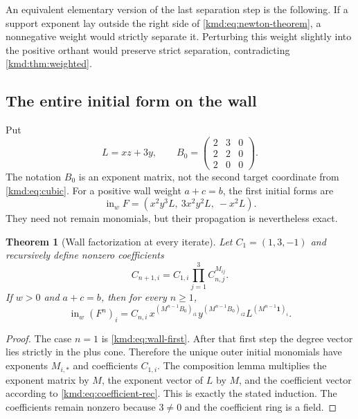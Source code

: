 \documentclass[11pt,a4paper]{article}
\numberwithin{equation}{section}
\newtheorem{theorem}{Theorem}[section]
\theoremstyle{definition}
\theoremstyle{remark}
\newcommand{\one}{\mathbf 1}
\newcommand{\init}{\operatorname{in}}
\begin{document}
An equivalent elementary version of the last separation step is the
following. If a support exponent lay outside the right side of
\eqref{kmd:eq:newton-theorem}, a nonnegative weight would strictly
separate it. Perturbing this weight slightly into the positive
orthant would preserve strict separation, contradicting
\cref{kmd:thm:weighted}.

\subsection{The entire initial form on the wall}
Put
\begin{equation}
 L=xz+3y,\qquad
 B_0=\begin{pmatrix}2&3&0\\2&2&0\\2&0&0\end{pmatrix}.
 \label{kmd:eq:B0}
\end{equation}
The notation $B_0$ is an exponent matrix, not the second target
coordinate from \eqref{kmd:eq:cubic}. For a positive wall weight
$a+c=b$, the first initial forms are
\begin{equation}
 \init_w F=(x^2y^3L,\ 3x^2y^2L,\ -x^2L).
 \label{kmd:eq:wall-first}
\end{equation}
They need not remain monomials, but their propagation is nevertheless
exact.

\begin{theorem}[Wall factorization at every iterate]\label{kmd:thm:wall}
Let $C_1=(1,3,-1)$ and recursively define nonzero coefficients
\begin{equation}
 C_{n+1,i}=C_{1,i}\prod_{j=1}^3C_{n,j}^{M_{ij}}.
 \label{kmd:eq:coefficient-rec}
\end{equation}
If $w>0$ and $a+c=b$, then for every $n\ge1$,
\begin{equation}
 \init_w(F^n)_i
 =C_{n,i}\,
 x^{(M^{n-1}B_0)_{i1}}
 y^{(M^{n-1}B_0)_{i2}}
 L^{(M^{n-1}\one)_i}.
 \label{kmd:eq:wall-all}
\end{equation}
\end{theorem}
\begin{proof}
The case $n=1$ is \eqref{kmd:eq:wall-first}. After that first step the
degree vector lies strictly in the plus cone. Therefore the unique
outer initial monomials have exponents $M_{i,*}$ and coefficients
$C_{1,i}$. The composition lemma multiplies the exponent matrix by
$M$, the exponent vector of $L$ by $M$, and the coefficient vector
according to \eqref{kmd:eq:coefficient-rec}. This is exactly the stated
induction. The coefficients remain nonzero because $3\ne0$ and the
coefficient ring is a field.
\end{proof}
\end{document}
